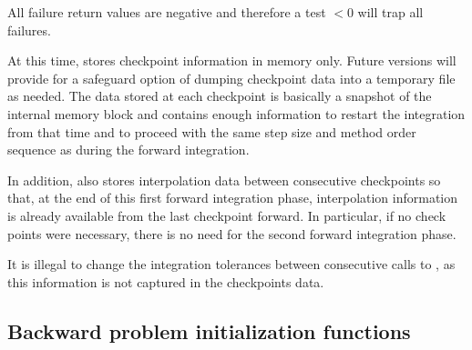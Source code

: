 {
  All failure return values are negative and therefore a test $< 0$
  will trap all  failures.

  At this time,  stores checkpoint information in memory only. 
  Future versions will provide for a safeguard option of dumping checkpoint
  data into a temporary file as needed. The data stored at each checkpoint is basically
  a snapshot of the {\cvodes} internal memory block and contains enough information
  to restart the integration from that time and to proceed with the same step size and
  method order sequence as during the forward integration.
  
  In addition,  also stores interpolation data between consecutive checkpoints
  so that, at the end of this first forward integration phase, interpolation information
  is already available from the last checkpoint forward. In particular,
  if no check points were necessary, there is no need for the second forward integration phase.

  {\warn}It is illegal to change the integration tolerances between consecutive calls
  to , as this information is not captured in the checkpoints data.
}  

\subsection{Backward problem initialization functions}
\label{sss:cvinitb}

